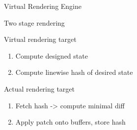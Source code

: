 \documentclass{beamer}
\begin{document}
\begin{frame}{Virtual Rendering Engine}


	Two stage rendering

	Virtual rendering target

	\begin{enumerate}

		\item Compute designed state


		\item Compute linewise hash of desired state

	\end{enumerate}


	Actual rendering target

	\begin{enumerate}

		\item Fetch hash -> compute minimal diff


		\item Apply patch onto buffers, store hash


	\end{enumerate}


\end{frame}
\end{document}
